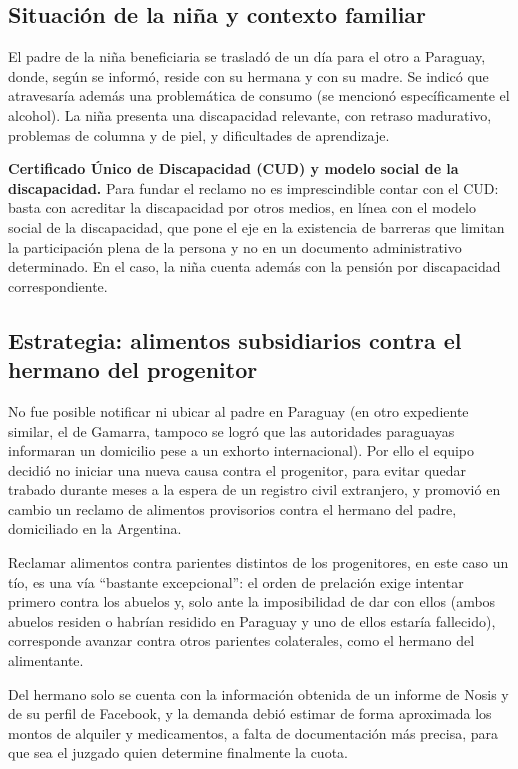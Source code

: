 \documentclass[12pt,oneside]{book}
\begin{document}
\subsection{Situación de la niña y contexto familiar}

El padre de la niña beneficiaria se trasladó de un día para el otro a Paraguay, donde, según se informó, reside con su hermana y con su madre. Se indicó que atravesaría además una problemática de consumo (se mencionó específicamente el alcohol). La niña presenta una discapacidad relevante, con retraso madurativo, problemas de columna y de piel, y dificultades de aprendizaje.

\begin{important}
\textbf{Certificado Único de Discapacidad (CUD) y modelo social de la discapacidad.} Para fundar el reclamo no es imprescindible contar con el CUD: basta con acreditar la discapacidad por otros medios, en línea con el modelo social de la discapacidad, que pone el eje en la existencia de barreras que limitan la participación plena de la persona y no en un documento administrativo determinado. En el caso, la niña cuenta además con la pensión por discapacidad correspondiente.
\end{important}

\subsection{Estrategia: alimentos subsidiarios contra el hermano del progenitor}

No fue posible notificar ni ubicar al padre en Paraguay (en otro expediente similar, el de Gamarra, tampoco se logró que las autoridades paraguayas informaran un domicilio pese a un exhorto internacional). Por ello el equipo decidió no iniciar una nueva causa contra el progenitor, para evitar quedar trabado durante meses a la espera de un registro civil extranjero, y promovió en cambio un reclamo de alimentos provisorios contra el hermano del padre, domiciliado en la Argentina.

Reclamar alimentos contra parientes distintos de los progenitores, en este caso un tío, es una vía ``bastante excepcional'': el orden de prelación exige intentar primero contra los abuelos y, solo ante la imposibilidad de dar con ellos (ambos abuelos residen o habrían residido en Paraguay y uno de ellos estaría fallecido), corresponde avanzar contra otros parientes colaterales, como el hermano del alimentante.

Del hermano solo se cuenta con la información obtenida de un informe de Nosis y de su perfil de Facebook, y la demanda debió estimar de forma aproximada los montos de alquiler y medicamentos, a falta de documentación más precisa, para que sea el juzgado quien determine finalmente la cuota.
\end{document}
